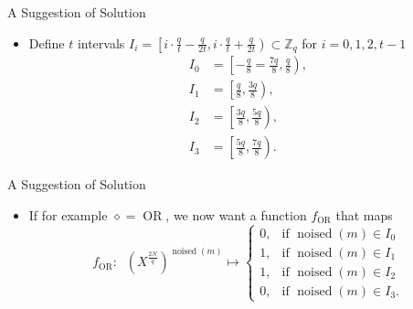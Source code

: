 \documentclass[aspectratio=169]{beamer}
\begin{document}
\begin{frame}{A Suggestion of Solution}
    \begin{itemize}
        \item Define $t$ intervals
        $I_i = \left[ i \cdot \frac{q}{t} - \frac{q}{2t},  i \cdot \frac{q}{t} + \frac{q}{2t}\right) \subset \mathbb{Z}_q$ for $i=0,1,2,t-1$
        \begin{align*}
            I_0 &= \left[-\frac{q}{8}=\frac{7q}{8}, \frac{q}{8}\right), \\
            I_1 &= \left[\frac{q}{8}, \frac{3q}{8}\right), \\
            I_2 &= \left[\frac{3q}{8}, \frac{5q}{8}\right), \\
            I_3 &= \left[\frac{5q}{8}, \frac{7q}{8}\right).
        \end{align*}
    \end{itemize}
\end{frame}

\begin{frame}{A Suggestion of Solution}
    \begin{itemize}
        \item If for example $\diamond = \operatorname{OR}$, we now want a function $f_{\operatorname{OR}}$ that maps
        \begin{equation*}
          f_{\operatorname{OR}}: \;\; \left (X^{\frac{2N}{q}}\right)^{\operatorname{noised}(m)} \mapsto
            \begin{cases}
              0, & \text{if $\operatorname{noised}(m) \in I_0$} \\
              1, & \text{if $\operatorname{noised}(m) \in I_1$} \\
              1, & \text{if $\operatorname{noised}(m) \in I_2$} \\
              0, & \text{if $\operatorname{noised}(m) \in I_3$}.
            \end{cases}
        \end{equation*}
    \end{itemize}
\end{frame}
\end{document}
